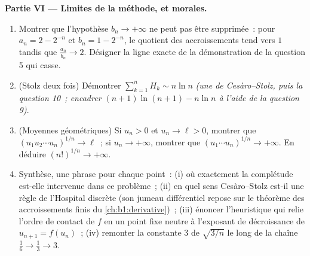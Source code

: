 \begin{problem}[{Devoir maison --- le \omterm{pb:b1:seq:1}{théorème de Cesàro--Stolz}
et l'asymptotique $u_n \sim \sqrt{3/n}$ pour $u_{n+1} = \sin
u_n$}]
\medskip
\noindent\textbf{Partie VI --- Limites de la méthode, et morales.}
\begin{enumerate}[resume]
  \item Montrer que l'hypothèse $b_n \to +\infty$ ne peut pas être
        supprimée~: pour $a_n = 2 - 2^{-n}$ et $b_n = 1 - 2^{-n}$,
        le quotient des accroissements tend vers $1$ tandis que
        $\frac{a_n} {b_n} \to 2$. Désigner la ligne exacte de la
        démonstration de la question 5 qui casse.
  \item (Stolz deux fois) Démontrer $\sum_{k=1}^{n} H_k \sim n \ln n$
        \emph{(une  de Cesàro--Stolz, puis la question
        10~; encadrer $(n+1)\ln(n+1) - n\ln n$ à l'aide de la
        question 9)}.
  \item (Moyennes géométriques) Si $u_n > 0$ et $u_n \to \ell > 0$,
        montrer que $(u_1 u_2 \cdots u_n)^{1/n} \to \ell$~; si $u_n
        \to +\infty$, montrer que $(u_1 \cdots u_n)^{1/n} \to
        +\infty$. En déduire $(n!)^{1/n} \to +\infty$.
  \item Synthèse, une phrase pour chaque point~: (i) où exactement la
        complétude est-elle intervenue dans ce problème~; (ii) en
        quel sens Cesàro--Stolz est-il une règle de l'Hospital
        discrète (son jumeau différentiel repose sur le théorème des
        accroissements finis du \cref{ch:b1:derivative})~; (iii)
        énoncer l'heuristique qui relie l'ordre de contact de $f$ en
        un point fixe neutre à l'exposant de décroissance de $u_{n+1}
        = f(u_n)$~; (iv) remonter la constante $3$ de $\sqrt{3/n}$ le
        long de la chaîne $\frac16 \to \frac13 \to 3$.
\end{enumerate}
\end{problem}
